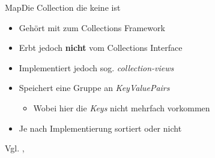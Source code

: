 \begin{frame}{Map}{Die Collection die keine ist}
    \begin{itemize}
        \item Gehört mit zum Collections Framework
        \item Erbt jedoch \textbf{nicht} vom Collections Interface
        \item Implementiert jedoch sog. \textit{collection-views}
        \item Speichert eine Gruppe an \textit{KeyValuePairs}
        \begin{itemize}
            \item Wobei hier die \textit{Keys} nicht mehrfach vorkommen
        \end{itemize}
        \item Je nach Implementierung sortiert oder nicht
    \end{itemize}
    
    Vgl. \cite{orac:map}, \cite{map1}
\end{frame}
